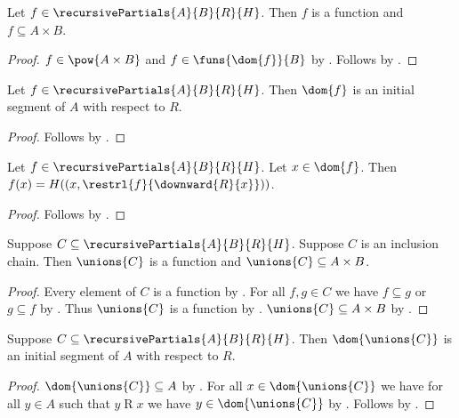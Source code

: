 \begin{proposition}\label{recursive_partial_is_function}
    Let $f\in\recursivePartials{A}{B}{R}{H}$.
    Then $f$ is a function and $f\subseteq A\times B$.
\end{proposition}
\begin{proof}
    $f\in\pow{A\times B}$ and $f\in\funs{\dom{f}}{B}$
        by .
    Follows by .
\end{proof}

\begin{proposition}\label{recursive_partial_domain_initial}
    Let $f\in\recursivePartials{A}{B}{R}{H}$.
    Then $\dom{f}$ is an initial segment of $A$ with respect to $R$.
\end{proposition}
\begin{proof}
    Follows by .
\end{proof}

\begin{proposition}\label{recursive_partial_equation}
    Let $f\in\recursivePartials{A}{B}{R}{H}$.
    Let $x\in\dom{f}$.
    Then $f(x)=H((x,\restrl{f}{\downward{R}{x}}))$.
\end{proposition}
\begin{proof}
    Follows by .
\end{proof}

\begin{proposition}\label{recursive_partial_union_is_function}
    Suppose $C\subseteq\recursivePartials{A}{B}{R}{H}$.
    Suppose $C$ is an inclusion chain.
    Then $\unions{C}$ is a function and $\unions{C}\subseteq A\times B$.
\end{proposition}
\begin{proof}
    Every element of $C$ is a function
        by .
    For all $f,g\in C$ we have $f\subseteq g$ or $g\subseteq f$
        by .
    Thus $\unions{C}$ is a function
        by .
    $\unions{C}\subseteq A\times B$
        by .
\end{proof}

\begin{proposition}\label{recursive_partial_union_domain_initial}
    Suppose $C\subseteq\recursivePartials{A}{B}{R}{H}$.
    Then $\dom{\unions{C}}$ is an initial segment of $A$ with respect to $R$.
\end{proposition}
\begin{proof}
    $\dom{\unions{C}}\subseteq A$
        by .
    For all $x\in\dom{\unions{C}}$ we have for all $y\in A$
        such that $y\mathrel{R}x$ we have $y\in\dom{\unions{C}}$
        by .
    Follows by .
\end{proof}

